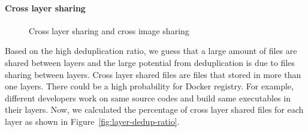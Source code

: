 
\paragraph{Cross layer sharing}

\begin{figure}
	\centering
	\caption{Cross layer sharing and cross image sharing}
	\label{fig:dedup-ratio}
\end{figure} 

Based on the high deduplication ratio, we guess that a large amount of files are shared between layers and the large potential from deduplication is due to files sharing between layers. Cross layer shared files are files that stored in more than one layers. There could be a high probability for Docker registry. For example, different developers work on same source codes and build same executables in their layers. Now, we calculated the percentage of cross layer shared files for each layer as shown in Figure~\ref{fig:layer-dedup-ratio}. 
 

